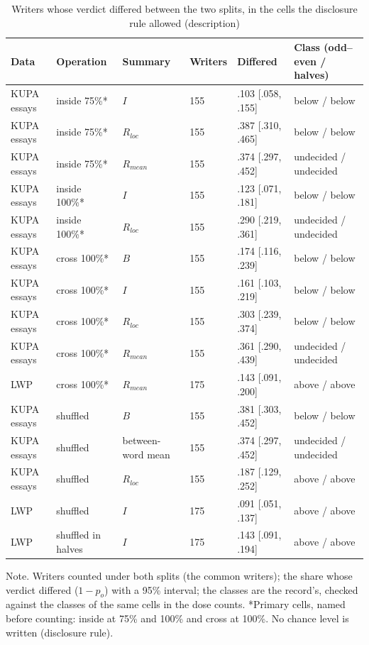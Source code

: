 \begin{table}[htbp]
\caption{Writers whose verdict differed between the two splits, in the cells the disclosure rule allowed (description)}
\label{tab:split}
\footnotesize
\begin{tabularx}{\linewidth}{@{}llllXX@{}}
\toprule
Data & Operation & Summary & Writers & Differed & Class (odd--even / halves) \\
\midrule
KUPA essays & inside 75\%* & $I$ & 155 & .103 [.058, .155] & below / below \\
KUPA essays & inside 75\%* & $R_{loc}$ & 155 & .387 [.310, .465] & below / below \\
KUPA essays & inside 75\%* & $R_{mean}$ & 155 & .374 [.297, .452] & undecided / undecided \\
KUPA essays & inside 100\%* & $I$ & 155 & .123 [.071, .181] & below / below \\
KUPA essays & inside 100\%* & $R_{loc}$ & 155 & .290 [.219, .361] & undecided / undecided \\
KUPA essays & cross 100\%* & $B$ & 155 & .174 [.116, .239] & below / below \\
KUPA essays & cross 100\%* & $I$ & 155 & .161 [.103, .219] & below / below \\
KUPA essays & cross 100\%* & $R_{loc}$ & 155 & .303 [.239, .374] & below / below \\
KUPA essays & cross 100\%* & $R_{mean}$ & 155 & .361 [.290, .439] & undecided / undecided \\
LWP & cross 100\%* & $R_{mean}$ & 175 & .143 [.091, .200] & above / above \\
KUPA essays & shuffled & $B$ & 155 & .381 [.303, .452] & below / below \\
KUPA essays & shuffled & between-word mean & 155 & .374 [.297, .452] & undecided / undecided \\
KUPA essays & shuffled & $R_{loc}$ & 155 & .187 [.129, .252] & above / above \\
LWP & shuffled & $I$ & 175 & .091 [.051, .137] & above / above \\
LWP & shuffled in halves & $I$ & 175 & .143 [.091, .194] & above / above \\
\bottomrule
\end{tabularx}
\par\smallskip\footnotesize Note. Writers counted under both splits (the common writers); the share whose verdict differed ($1 - p_o$) with a 95\% interval; the classes are the record's, checked against the classes of the same cells in the dose counts. *Primary cells, named before counting: inside at 75\% and 100\% and cross at 100\%. No chance level is written (disclosure rule).
\end{table}

